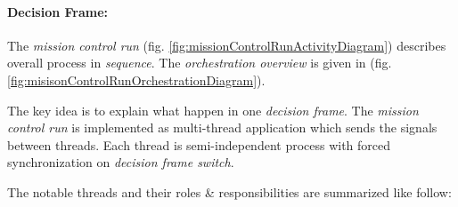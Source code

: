 \paragraph{Decision Frame:} The \emph{mission control run} (fig. \ref{fig:missionControlRunActivityDiagram}) describes overall process in \emph{sequence}. The \emph{orchestration overview} is given in (fig. \ref{fig:misisonControlRunOrchestrationDiagram}).

The key idea is to explain what happen in one \emph{decision frame}. The \emph{mission control run} is implemented as multi-thread application which sends the signals between threads. Each thread is semi-independent process with forced synchronization on \emph{decision frame switch}.

\noindent The notable threads and their roles \& responsibilities are summarized like follow:
